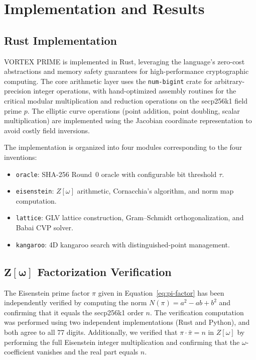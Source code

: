\documentclass[11pt,a4paper]{article}
\theoremstyle{definition}
\begin{document}
\section{Implementation and Results}

\subsection{Rust Implementation}

VORTEX PRIME is implemented in Rust, leveraging the language's zero-cost abstractions and memory safety guarantees for high-performance cryptographic computing. The core arithmetic layer uses the \texttt{num-bigint} crate for arbitrary-precision integer operations, with hand-optimized assembly routines for the critical modular multiplication and reduction operations on the secp256k1 field prime $p$. The elliptic curve operations (point addition, point doubling, scalar multiplication) are implemented using the Jacobian coordinate representation to avoid costly field inversions.

The implementation is organized into four modules corresponding to the four inventions:
\begin{itemize}
  \item \texttt{oracle}: SHA-256 Round~0 oracle with configurable bit threshold $\tau$.
  \item \texttt{eisenstein}: $Z[\omega]$ arithmetic, Cornacchia's algorithm, and norm map computation.
  \item \texttt{lattice}: GLV lattice construction, Gram--Schmidt orthogonalization, and Babai CVP solver.
  \item \texttt{kangaroo}: 4D kangaroo search with distinguished-point management.
\end{itemize}

\subsection{$\mathbf{Z[\omega]}$ Factorization Verification}

The Eisenstein prime factor $\pi$ given in Equation~\ref{eq:pi-factor} has been independently verified by computing the norm $N(\pi) = a^2 - ab + b^2$ and confirming that it equals the secp256k1 order $n$. The verification computation was performed using two independent implementations (Rust and Python), and both agree to all 77 digits. Additionally, we verified that $\pi \cdot \bar{\pi} = n$ in $Z[\omega]$ by performing the full Eisenstein integer multiplication and confirming that the $\omega$-coefficient vanishes and the real part equals $n$.
\end{document}
